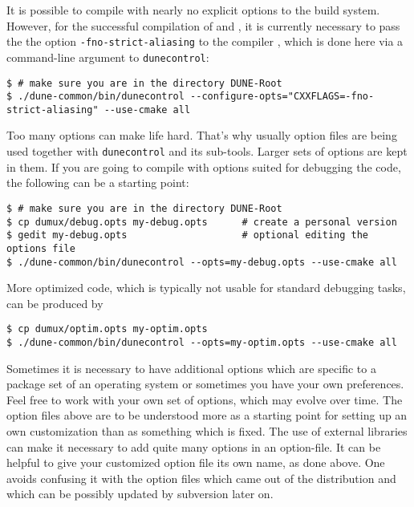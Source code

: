 It is possible to compile \Dumux with nearly no explicit options to the build system.
However, for the successful compilation of \Dune and \Dumux, it is currently necessary to pass the
the option \texttt{-fno-strict-aliasing} to the \Cplusplus compiler
\cite{WIKIPED-ALIASING}, which is done here via a command-line argument to \texttt{dunecontrol}:
\begin{lstlisting}[style=Bash]
$ # make sure you are in the directory DUNE-Root
$ ./dune-common/bin/dunecontrol --configure-opts="CXXFLAGS=-fno-strict-aliasing" --use-cmake all
\end{lstlisting}

Too many options can make life hard. That's why usually option files are being used together with \texttt{dunecontrol} and its sub-tools.
Larger sets of options are kept in them. If you are going to compile with options suited for debugging the code, the following
can be a starting point:
\begin{lstlisting}[style=Bash]
$ # make sure you are in the directory DUNE-Root
$ cp dumux/debug.opts my-debug.opts      # create a personal version
$ gedit my-debug.opts                    # optional editing the options file
$ ./dune-common/bin/dunecontrol --opts=my-debug.opts --use-cmake all
\end{lstlisting}

More optimized code, which is typically not usable for standard debugging tasks, can be produced by
\begin{lstlisting}[style=Bash]
$ cp dumux/optim.opts my-optim.opts
$ ./dune-common/bin/dunecontrol --opts=my-optim.opts --use-cmake all
\end{lstlisting}

Sometimes it is necessary to have additional options which
are specific to a package set of an operating system or
sometimes you have your own preferences.
Feel free to work with your own set of options, which may evolve over time.
The option files above are to be understood more as a starting point
for setting up an own customization than as something which is fixed.
The use of external libraries can make it necessary to add quite many options in an option-file.
It can be helpful to give your customized option file its own name, as done above.
One avoids confusing it with the option files which came out of the distribution
and which can be possibly updated by subversion later on.


